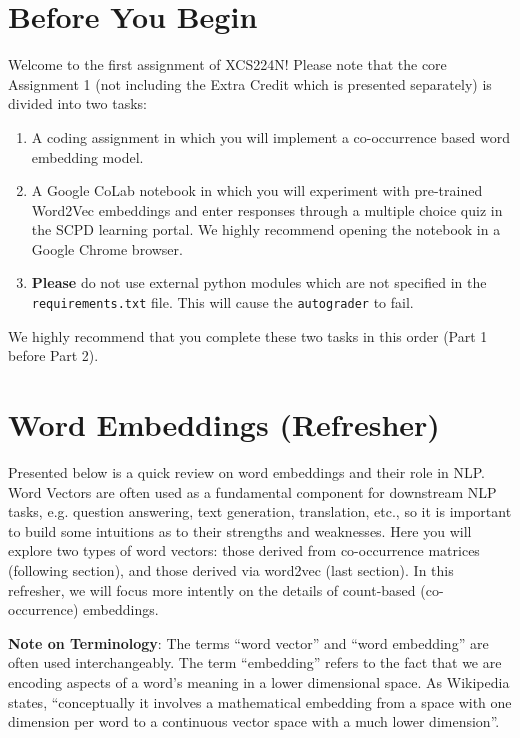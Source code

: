 \section*{Before You Begin}
Welcome to the first assignment of XCS224N! Please note that the core Assignment 1 (not including the Extra Credit which is presented separately) is divided into two tasks:
\begin{enumerate}
    \item A coding assignment in which you will implement a co-occurrence based word embedding model.
    \item A Google CoLab notebook in which you will experiment with pre-trained Word2Vec embeddings and enter responses through a multiple choice quiz in the SCPD learning portal. We highly recommend opening the notebook in a Google Chrome browser.  
    \item \textbf{Please} do not use external python modules which are not specified in the \texttt{requirements.txt} file. This will cause the \texttt{autograder} to fail.
\end{enumerate}
We highly recommend that you complete these two tasks in this order (Part 1 before Part 2). 
\newline

\section*{Word Embeddings (Refresher)}
Presented below is a quick review on word embeddings and their role in NLP. Word Vectors are often used as a fundamental component for downstream NLP tasks, e.g. question answering, text generation, translation, etc., so it is important to build some intuitions as to their strengths and weaknesses. Here you will explore two types of word vectors: those derived from co-occurrence matrices (following section), and those derived via word2vec (last section). In this refresher, we will focus more intently on the details of count-based (co-occurrence) embeddings. \newline

\textbf{Note on Terminology}: The terms ``word vector'' and ``word embedding'' are often used interchangeably. The term ``embedding'' refers to the fact that we are encoding aspects of a word's meaning in a lower dimensional space. As Wikipedia states, ``conceptually it involves a mathematical embedding from a space with one dimension per word to a continuous vector space with a much lower dimension''.

